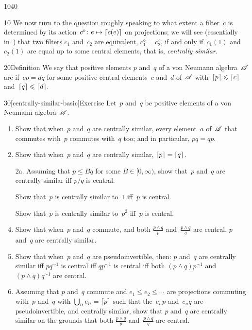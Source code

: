 \begin{parsec}{1040}%
\begin{point}{10}%
We now turn 
	to the question
	roughly speaking 
to what extent a filter~$c$ is determined by
its action~$c^\diamond\colon e\mapsto \left\lceil c(e)\right\rceil$ on projections;
we will see (essentially in~)
that two filters $c_1$ and~$c_2$
are equivalent, $c_1^\diamond = c_2^\diamond$,
if and only if~$c_1(1)$ and~$c_2(1)$
are equal up to some central elements,
that is, \emph{centrally similar}.
\end{point}
\begin{point}{20}{Definition}%
We say that positive elements $p$ and~$q$ of a von Neumann algebra~$\mathscr{A}$
are 
if~$cp=dq$ for some positive central elements~$c$ and~$d$ of~$\mathscr{A}$
with~$\left\lceil p\right\rceil\leqslant \left\lceil c\right\rceil$
and~$\left\lceil q\right\rceil\leqslant \left\lceil d\right\rceil$.
\end{point}
\begin{point}{30}[centrally-similar-basic]{Exercise}%
Let~$p$ and~$q$ be positive elements
of a von Neumann algebra~$\mathscr{A}$.
\begin{enumerate}
\item
Show that when~$p$ and~$q$ are centrally similar,
every element~$a$ of~$\mathscr{A}$ that commutes
with~$p$ commutes with~$q$ too;
and in particular, $pq=qp$.
\item
Show that when~$p$ and~$q$ are centrally similar,
$\left\lceil p\right\rceil=\left\lceil q\right\rceil$.
\item[2a.]
Assuming that $p\leq Bq$ for some $B\in [0,\infty)$,
show that~$p$ and~$q$ are centrally similar iff $p/q$ is central.

Show that~$p$ is centrally similar to~$1$ iff~$p$ is central.

Show that~$p$ is centrally similar to~$p^2$ iff~$p$ is central.
\item
Show that when~$p$ and~$q$ commute,
and both $\frac{p\wedge q}{p}$ 
and~$\frac{p\wedge q}{q}$
are central,
$p$ and~$q$ are centrally similar.
\item
Show that when~$p$ and~$q$ are pseudoinvertible,
then:
$p$ and~$q$ are centrally similar iff
$pq^{\sim 1}$ is central
iff $qp^{\sim 1}$ is central
iff both $(p\wedge q)p^{\sim 1}$
and~$(p\wedge q)q^{\sim 1}$ are central.
\item
Assuming that $p$ and~$q$ commute
and $e_1 \leq e_2 \leq \dotsb$
are projections commuting with~$p$ and~$q$
with~$\bigcup_n e_n=\left\lceil p\right\rceil$
such that the~$e_np$ and~$e_nq$
are pseudoinvertible,
and centrally similar,
show that $p$ and~$q$ are centrally similar
on the 
grounds that both  $\frac{p\wedge q}{p}$
and~$\frac{p\wedge q}{q}$ are central.


\end{enumerate}
\end{point}
\end{parsec}
